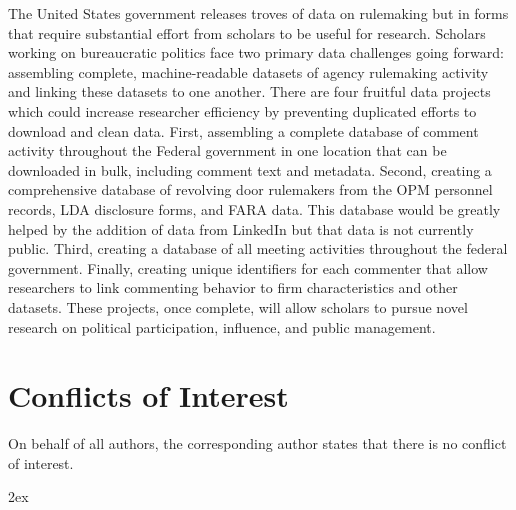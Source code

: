 \documentclass[12pt,notitlepage]{article}
\newcounter{cor}
\newcounter{def}
\begin{document}
The United States government releases troves of data on rulemaking but
in forms that require substantial effort from scholars to be useful for
research. Scholars working on bureaucratic politics face two primary
data challenges going forward: assembling complete, machine-readable
datasets of agency rulemaking activity and linking these datasets to one
another. There are four fruitful data projects which could increase
researcher efficiency by preventing duplicated efforts to download and
clean data. First, assembling a complete database of comment activity
throughout the Federal government in one location that can be downloaded
in bulk, including comment text and metadata. Second, creating a
comprehensive database of revolving door rulemakers from the OPM
personnel records, LDA disclosure forms, and FARA data. This database
would be greatly helped by the addition of data from LinkedIn but that
data is not currently public. Third, creating a database of all meeting
activities throughout the federal government. Finally, creating unique
identifiers for each commenter that allow researchers to link commenting
behavior to firm characteristics and other datasets. These projects,
once complete, will allow scholars to pursue novel research on political
participation, influence, and public management.

\hypertarget{conflicts-of-interest}{%
\section{Conflicts of Interest}\label{conflicts-of-interest}}

On behalf of all authors, the corresponding author states that there is
no conflict of interest.
	
	\newpage
	
	\theendnotes
		
	\begingroup
	\parindent 0pt
	\parskip 2ex
	\def\enotesize{\normalsize}
	\endgroup
	
	\newpage
		\singlespacing
	
	
\end{document}
